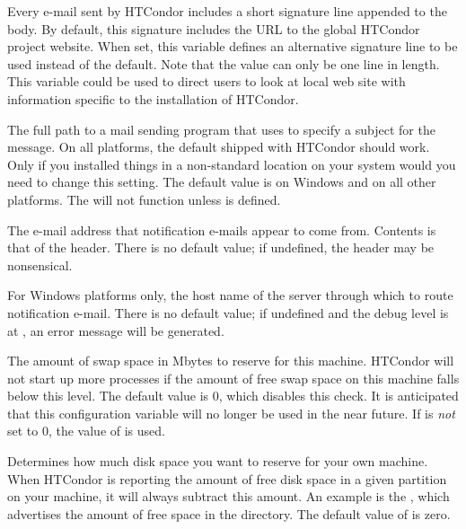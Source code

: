 \begin{description}
\label{param:EmailSignature}
\item[\Macro{EMAIL\_SIGNATURE}]
  Every e-mail sent by HTCondor includes a short signature line appended
  to the body.  By default, this signature includes the URL to the
  global HTCondor project website.  
  When set, this variable defines an alternative signature line to be
  used instead of the default. 
  Note that the value can only be one line in length.
  This variable could be used to direct users
  to look at local web site with information specific to the installation
  of HTCondor.

\label{param:Mail}
\item[\Macro{MAIL}]
  The full path to a mail
  sending program that uses  to specify a subject for the
  message.  On all platforms, the default shipped with HTCondor should
  work.  Only if you installed things in a non-standard location on
  your system would you need to change this setting.
  The default value is  on Windows
  and  on all other platforms.
  The  will not
  function unless  is defined.

\label{param:MailFrom}
\item[\Macro{MAIL\_FROM}]
  The e-mail address that notification e-mails appear to come from.
  Contents is that of the  header.
  There is no default value; if undefined, the  header may
  be nonsensical.

\label{param:SMTPServer}
\item[\Macro{SMTP\_SERVER}]
  For Windows platforms only, the host name of the server through which
  to route notification e-mail.
  There is no default value; if undefined and the debug level is
  at  , an error message will be generated.

\label{param:ReservedSwap}
\item[\Macro{RESERVED\_SWAP}]
  The amount of swap space in Mbytes to reserve for this machine.
  HTCondor will not start up more  processes if the
  amount of free swap space on this machine falls below this level.
  The default value is 0, which disables this check.
  It is anticipated that this configuration variable will no longer
  be used in the near future.
  If  is \emph{not} set to 0,
  the value of  is used.

\label{param:ReservedDisk}
\item[\Macro{RESERVED\_DISK}]
  Determines how much disk space you want to reserve for your own machine.
  When HTCondor is reporting the amount of free disk space in a given
  partition on your machine, it will always subtract this amount.  An
  example is the , which advertises the amount of free
  space in the  directory.  The default value of
   is zero.
  

\end{description}
